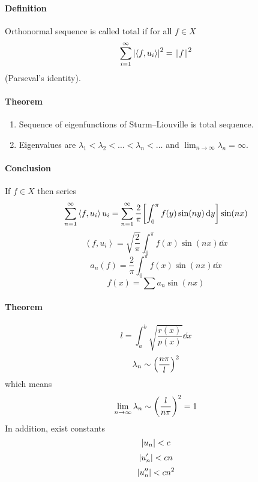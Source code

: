 \paragraph{Definition}
Orthonormal sequence is called total if for all $f\in X$ 
$$\sum_{i=1}^\infty \abs{\left\langle  f,u_i\right\rangle}^2 = \norm{f}^2$$
(Parseval's identity).
\paragraph{Theorem}
\begin{enumerate}
	\item Sequence of eigenfunctions of  Sturm–Liouville is total sequence.
	\item Eigenvalues are $\lambda_1 < \lambda_2 < \dots < \lambda_n < \dots$ and $\lim_{n\to \infty} \lambda_n = \infty$.
\end{enumerate}
\paragraph{Conclusion}
If $f\in X$ then series 
$$\sum_{n=1}^{\infty} \left\langle  f,u_i\right\rangle u_i = \sum_{n=1}^\infty \frac{2}{\pi} \qty[\int_0^\pi f(y) \sin(ny) \dd{y}] \sin(nx)$$ 
$$\left\langle  f,u_i\right\rangle = \sqrt{\frac{2}{\pi}} \int_0^\pi f(x) \sin(nx) \dd{x}$$
$$a_n(f) = \frac{2}{\pi } \int_0^\pi f(x) \sin(nx) \dd{x}$$
$$f(x) = \sum a_n \sin(n x)$$
\paragraph{Theorem} 
$$l = \int_a^b \sqrt{\frac{r(x)}{p(x)}} \dd{x}$$
$$\lambda_n \sim \qty(\frac{n\pi}{l})^2$$
which means
$$\lim_{n\to \infty} \lambda_n \sim \qty(\frac{l}{n\pi})^2 = 1$$
In addition, exist constants
$$\abs{u_n}<c$$
$$\abs{u'_n}<cn$$
$$\abs{u''_n}<cn^2$$
